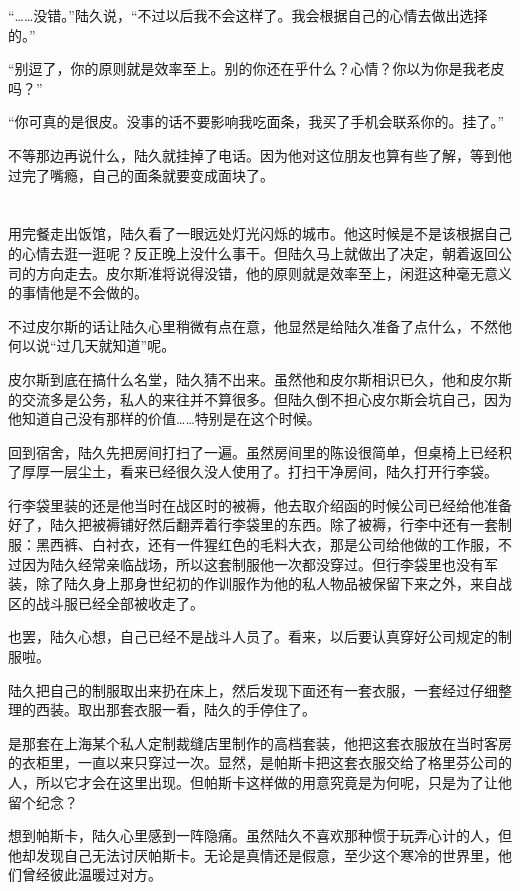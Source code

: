 “……没错。”陆久说，“不过以后我不会这样了。我会根据自己的心情去做出选择的。”

“别逗了，你的原则就是效率至上。别的你还在乎什么？心情？你以为你是我老皮吗？”

“你可真的是很皮。没事的话不要影响我吃面条，我买了手机会联系你的。挂了。”

不等那边再说什么，陆久就挂掉了电话。因为他对这位朋友也算有些了解，等到他过完了嘴瘾，自己的面条就要变成面块了。



\section*{}

用完餐走出饭馆，陆久看了一眼远处灯光闪烁的城市。他这时候是不是该根据自己的心情去逛一逛呢？反正晚上没什么事干。但陆久马上就做出了决定，朝着返回公司的方向走去。皮尔斯准将说得没错，他的原则就是效率至上，闲逛这种毫无意义的事情他是不会做的。

不过皮尔斯的话让陆久心里稍微有点在意，他显然是给陆久准备了点什么，不然他何以说“过几天就知道”呢。

皮尔斯到底在搞什么名堂，陆久猜不出来。虽然他和皮尔斯相识已久，他和皮尔斯的交流多是公务，私人的来往并不算很多。但陆久倒不担心皮尔斯会坑自己，因为他知道自己没有那样的价值……特别是在这个时候。

回到宿舍，陆久先把房间打扫了一遍。虽然房间里的陈设很简单，但桌椅上已经积了厚厚一层尘土，看来已经很久没人使用了。打扫干净房间，陆久打开行李袋。

行李袋里装的还是他当时在战区时的被褥，他去取介绍函的时候公司已经给他准备好了，陆久把被褥铺好然后翻弄着行李袋里的东西。除了被褥，行李中还有一套制服：黑西裤、白衬衣，还有一件猩红色的毛料大衣，那是公司给他做的工作服，不过因为陆久经常亲临战场，所以这套制服他一次都没穿过。但行李袋里也没有军装，除了陆久身上那身世纪初的作训服作为他的私人物品被保留下来之外，来自战区的战斗服已经全部被收走了。

也罢，陆久心想，自己已经不是战斗人员了。看来，以后要认真穿好公司规定的制服啦。

陆久把自己的制服取出来扔在床上，然后发现下面还有一套衣服，一套经过仔细整理的西装。取出那套衣服一看，陆久的手停住了。

是那套在上海某个私人定制裁缝店里制作的高档套装，他把这套衣服放在当时客房的衣柜里，一直以来只穿过一次。显然，是帕斯卡把这套衣服交给了格里芬公司的人，所以它才会在这里出现。但帕斯卡这样做的用意究竟是为何呢，只是为了让他留个纪念？

想到帕斯卡，陆久心里感到一阵隐痛。虽然陆久不喜欢那种惯于玩弄心计的人，但他却发现自己无法讨厌帕斯卡。无论是真情还是假意，至少这个寒冷的世界里，他们曾经彼此温暖过对方。

